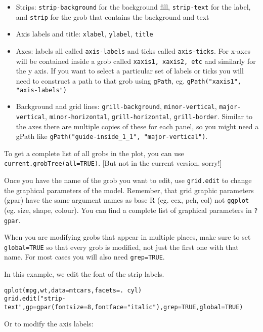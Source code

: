 \begin{itemize}
	\item Strips: {\tt strip-background} for the background fill, {\tt strip-text} for the label, and {\tt strip} for the grob that contains the background and text

	\item Axis labels and title: {\tt xlabel}, {\tt ylabel}, {\tt title}
	
	\item Axes: labels all called {\tt axis-labels} and ticks called {\tt axis-ticks}.  For x-axes will be contained inside a grob called {\tt xaxis1, xaxis2, etc} and similarly for the y axis.  If you want to select a particular set of labels or ticks you will need to construct a path to that grob using {\tt gPath}, eg. {\tt gPath("xaxis1", "axis-labels")}

	\item Background and grid lines: {\tt grill-background}, {\tt minor-vertical}, {\tt major-vertical}, {\tt minor-horizontal}, {\tt grill-horizontal}, {\tt grill-border}.  Similar to the axes there are multiple copies of these for each panel, so you might need a gPath like {\tt gPath("guide-inside_1_1", "major-vertical")}.
\end{itemize}

To get a complete list of all grobs in the plot, you can use {\tt current.grobTree(all=TRUE)}.  [But not in the current version, sorry!]

Once you have the name of the grob you want to edit, use  {\tt grid.edit} to change the graphical parameters of the model.  Remember, that grid graphic parameters (gpar) have the same argument names as base R (eg. cex, pch, col) not {\tt ggplot} (eg. size, shape, colour).  You can find a complete list of graphical parameters in {\tt ?gpar}.

When you are modifying grobs that appear in multiple places, make sure to set {\tt global=TRUE} so that every grob is modified, not just the first one with that name.  For most cases you will also need {\tt grep=TRUE}.

In this example, we edit the font of the strip labels.

\begin{alltt}
qplot(mpg, wt, data=mtcars, facets = . ~ cyl)
grid.edit("strip-text", gp=gpar(fontsize=8, fontface="italic"), grep=TRUE, global=TRUE)
\end{alltt}

Or to modify the axis labels:

